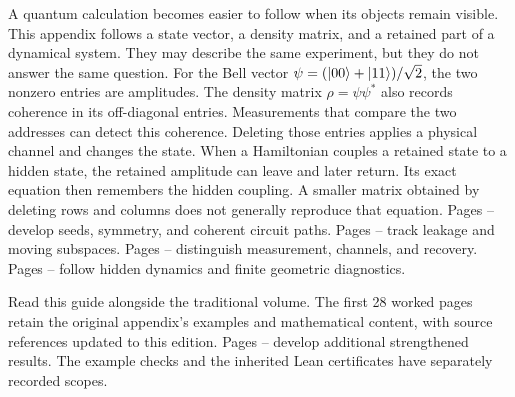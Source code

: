 A quantum calculation becomes easier to follow when its objects remain visible. This appendix follows a state vector, a density matrix, and a retained part of a dynamical system. They may describe the same experiment, but they do not answer the same question.
For the Bell vector $\psi=(\lvert 00\rangle+\lvert 11\rangle)/\sqrt2$, the two nonzero entries are amplitudes. The density matrix $\rho=\psi\psi^*$ also records coherence in its off-diagonal entries. Measurements that compare the two addresses can detect this coherence. Deleting those entries applies a physical channel and changes the state.
When a Hamiltonian couples a retained state to a hidden state, the retained amplitude can leave and later return. Its exact equation then remembers the hidden coupling. A smaller matrix obtained by deleting rows and columns does not generally reproduce that equation.
Pages -- develop seeds, symmetry, and coherent circuit paths. Pages -- track leakage and moving subspaces. Pages -- distinguish measurement, channels, and recovery. Pages -- follow hidden dynamics and finite geometric diagnostics.

Read this guide alongside the traditional volume. The first 28 worked pages retain the original appendix's examples and mathematical content, with source references updated to this edition. Pages -- develop additional strengthened results. The example checks and the inherited Lean certificates have separately recorded scopes.

